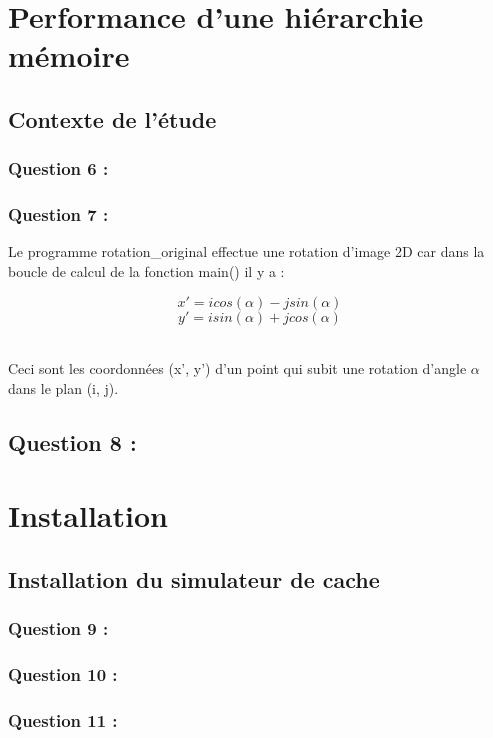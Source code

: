 \documentclass[11pt,a4paper]{article}
\begin{document}
\section{Performance d’une hiérarchie mémoire}
    \subsection{Contexte de l’étude}
        \subsubsection{Question 6 :}
        
        \subsubsection{Question 7 :}
        
Le programme rotation\_original effectue une rotation d’image 2D car dans la
boucle de calcul de la fonction main() il y a :
\begin{center}
    \[x' = icos(\alpha ) - jsin(\alpha )\]
    \[y' = isin(\alpha ) + jcos(\alpha )\]
\end{center}
\\
Ceci sont les coordonnées (x', y') d'un point qui subit une rotation d'angle
$\alpha$ dans le plan (i, j).

        \subsection{Question 8 :}
        
\section{Installation}
    \subsection{ Installation du simulateur de cache}
        \subsubsection{Question 9 :}
        
        \subsubsection{Question 10 :}
        
        \subsubsection{Question 11 :}
        
\end{document}
